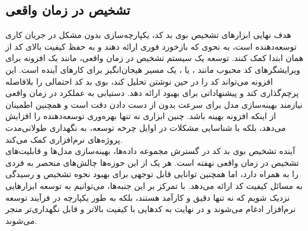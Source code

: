 \subsection{تشخیص در زمان واقعی}

هدف نهایی ابزارهای تشخیص بوی بد کد، یکپارچه‌سازی بدون مشکل در جریان کاری توسعه‌دهنده است، به نحوی که بازخورد فوری ارائه دهند و به حفظ کیفیت بالای کد از همان ابتدا کمک کنند. توسعه یک سیستم تشخیص در زمان واقعی، مانند یک افزونه برای ویرایشگرهای کد محبوب مانند ،  یا ، یک مسیر هیجان‌انگیز برای کارهای آینده است. این افزونه می‌تواند کد را در حین نوشتن تحلیل کند، بوی بد کد احتمالی را بلافاصله پرچم‌گذاری کند و پیشنهاداتی برای بهبود ارائه دهد. دستیابی به عملکرد در زمان واقعی نیازمند بهینه‌سازی مدل برای سرعت بدون از دست دادن دقت است و همچنین اطمینان از اینکه افزونه بهینه باشد. چنین ابزاری نه تنها بهره‌وری توسعه‌دهنده را افزایش می‌دهد، بلکه با شناسایی مشکلات در اوایل چرخه توسعه، به نگهداری طولانی‌مدت پروژه‌های نرم‌افزاری کمک می‌کند.
\\
آینده تشخیص بوی بد کد در گسترش مجموعه داده‌ها، بهینه‌سازی مدل‌ها و قابلیت‌های تشخیص در زمان واقعی نهفته است. هر یک از این حوزه‌ها چالش‌های منحصر به فردی را به همراه دارد، اما همچنین توانایی قابل توجهی برای بهبود نحوه تشخیص و رسیدگی به مسائل کیفیت کد ارائه می‌دهد. با تمرکز بر این جنبه‌ها، می‌توانیم به توسعه ابزارهایی نزدیک شویم که نه تنها دقیق و کارآمد هستند، بلکه به طور یکپارچه در فرآیند توسعه نرم‌افزار ادغام می‌شوند و در نهایت به کدهایی با کیفیت بالاتر و قابل نگهداری‌تر منجر می‌شوند.
\clearpage
